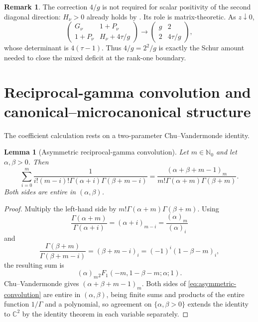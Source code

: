 \documentclass[11pt,a4paper]{amsart}
\numberwithin{equation}{section}
\theoremstyle{plain}
\newtheorem{lemma}[theorem]{Lemma}
\theoremstyle{definition}
\newtheorem{remark}[theorem]{Remark}
\newcommand{\N}{\mathbb N}
\begin{document}
\begin{remark}\label{rem:schur-correction}
The correction \(4/g\) is not required for scalar positivity of the second
diagonal direction: \(H_\nu>0\) already holds by .  Its role
is matrix-theoretic.  As \(z\downarrow0\),
\[
 \begin{pmatrix}
  G_\nu&1+P_\nu\\
  1+P_\nu&H_\nu+4\tau/g
 \end{pmatrix}
 \longrightarrow
 \begin{pmatrix}g&2\\2&4\tau/g\end{pmatrix},
\]
whose determinant is \(4(\tau-1)\).  Thus \(4/g=2^2/g\) is exactly the Schur
amount needed to close the mixed deficit at the rank-one boundary.
\end{remark}

\section{Reciprocal-gamma convolution and canonical--microcanonical structure}\label{sec:coefficients}

The coefficient calculation rests on a two-parameter Chu--Vandermonde identity.

\begin{lemma}[Asymmetric reciprocal-gamma convolution]\label{lem:convolution}
Let \(m\in\N_0\) and let \(\alpha,\beta>0\).  Then
\begin{equation}\label{eq:asymmetric-convolution}
 \sum_{i=0}^m
 \frac1{i!(m-i)!\Gamma(\alpha+i)\Gamma(\beta+m-i)}
 =\frac{(\alpha+\beta+m-1)_m}
 {m!\Gamma(\alpha+m)\Gamma(\beta+m)}.
\end{equation}
Both sides are entire in \((\alpha,\beta)\).
\end{lemma}

\begin{proof}
Multiply the left-hand side by \(m!\Gamma(\alpha+m)\Gamma(\beta+m)\).  Using
\[
 \frac{\Gamma(\alpha+m)}{\Gamma(\alpha+i)}=(\alpha+i)_{m-i}
 =\frac{(\alpha)_m}{(\alpha)_i}
\]
and
\[
 \frac{\Gamma(\beta+m)}{\Gamma(\beta+m-i)}
 =(\beta+m-i)_i=(-1)^i(1-\beta-m)_i,
\]
the resulting sum is
\[
 (\alpha)_m
 {}_2F_1(-m,1-\beta-m;\alpha;1).
\]
Chu--Vandermonde gives \((\alpha+\beta+m-1)_m\).  Both sides of
\eqref{eq:asymmetric-convolution} are entire in \((\alpha,\beta)\), being finite
sums and products of the entire function \(1/\Gamma\) and a polynomial, so
agreement on \(\{\alpha,\beta>0\}\) extends the identity to \(\mathbb C^2\) by the
identity theorem in each variable separately.
\end{proof}
\end{document}
